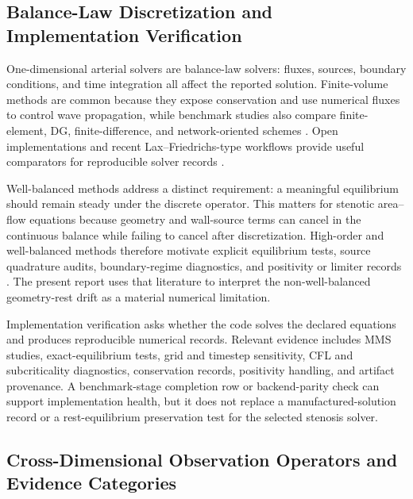 \subsection{Balance-Law Discretization and Implementation Verification}
\label{subsec:verification-literature}

One-dimensional arterial solvers are balance-law solvers: fluxes, sources,
boundary conditions, and time integration all affect the reported solution.
Finite-volume methods are common because they expose conservation and use
numerical fluxes to control wave propagation, while benchmark studies also
compare finite-element, DG, finite-difference, and network-oriented schemes
\cite{LeVeque2002FiniteVolumeMethodsForHyperbolicProblems,BoileauEtAl2015Benchmark,Wang2014BloodFlowNetworks}. Open implementations and recent
Lax--Friedrichs-type workflows provide useful comparators for reproducible solver
records
\cite{BenemeritoEtAl2024OpenBF,BeckersKolbe2025LaxFriedrichsHemodynamics}.

Well-balanced methods address a distinct requirement: a meaningful equilibrium
should remain steady under the discrete operator. This matters for stenotic
area--flow equations because geometry and wall-source terms can cancel in the
continuous balance while failing to cancel after discretization. High-order and
well-balanced methods therefore motivate explicit equilibrium tests, source
quadrature audits, boundary-regime diagnostics, and positivity or limiter records
\cite{PimentelGarciaEtAl2025HighOrderWellBalanced}. The present report uses that
literature to interpret the non-well-balanced geometry-rest drift as a material
numerical limitation.

Implementation verification asks whether the code solves the declared equations
and produces reproducible numerical records. Relevant evidence includes MMS
studies, exact-equilibrium tests, grid and timestep sensitivity, CFL and
subcriticality diagnostics, conservation records, positivity handling, and
artifact provenance. A benchmark-stage completion row or backend-parity check can
support implementation health, but it does not replace a manufactured-solution
record or a rest-equilibrium preservation test for the selected stenosis solver.

\subsection{Cross-Dimensional Observation Operators and Evidence Categories}
\label{subsec:cross-dimensional-comparison-review}

